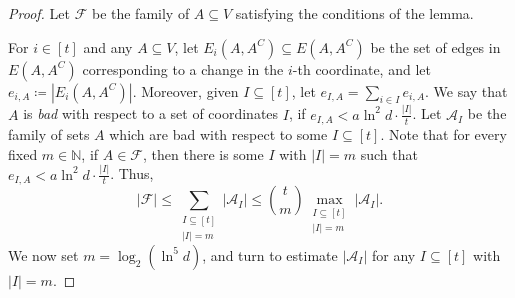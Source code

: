 \documentclass[10pt,a4paper]{article}
\begin{document}
\begin{proof}
Let $\mathcal{F}$ be the family of $A\subseteq V$ satisfying the conditions of the lemma.

For $i\in [t]$ and any $A\subseteq V$, let $E_i(A,A^C)\subseteq E(A,A^C)$ be the set of edges in $E(A,A^C)$ corresponding to a change in the $i$-th coordinate, and let $e_{i,A}\coloneqq |E_i(A,A^C)|$. Moreover, given $I\subseteq [t]$, let $e_{I,A}=\sum_{i\in I}e_{i,A}$. We say that $A$ is \textit{bad} with respect to a set of coordinates $I$, if $e_{I,A}< a\ln^2d\cdot \frac{|I|}{t}$. Let $\mathcal{A}_{I}$ be the family of sets $A$ which are bad with respect to some $I\subseteq [t]$. Note that for every fixed $m \in \mathbb{N}$, if $A\in \mathcal{F}$, then there is some $I$ with $|I|=m$ such that $e_{I,A}< a\ln^2d\cdot \frac{|I|}{t}$. Thus,
\[|\mathcal{F}|\le \sum_{\substack{I \subseteq [t]\\|I|=m}} |\mathcal{A}_I| \leq \binom{t}{m} \max_{\substack{I \subseteq [t]\\|I|=m}} |\mathcal{A}_I|.\]
We now set $m=\log_2\left(\ln^5 d\right)$, and turn to estimate $|\mathcal{A}_I|$ for any $I \subseteq [t]$ with $|I|=m$.


\end{proof}
\end{document}
